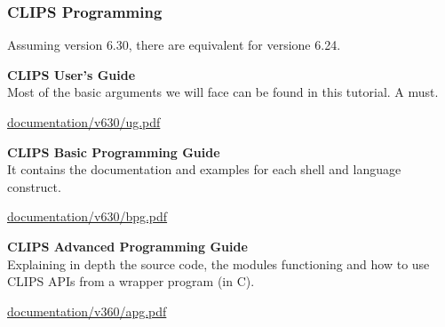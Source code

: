 \documentclass[xcolor={usenames,dvipsnames,svgnames}, compress]{beamer}
\begin{document}
\begin{frame}
  
  \frametitle{CLIPS Programming}
  
  Assuming version \textsf{6.30}, there are equivalent for versione \textsf{6.24}.\par\bigskip
  
  
  \textbf{CLIPS User's Guide}\\
  Most of the basic arguments we will face can be found in this
  tutorial. A must.
  \begin{flushright}
    \vspace{-5pt}
    \href{http://clipsrules.sourceforge.net/documentation/v630/ug.pdf}{documentation/v630/ug.pdf}
  \end{flushright}
  
  
  
  \textbf{CLIPS Basic Programming Guide}\\
  It contains the documentation and examples for each shell and
  language construct.
  \begin{flushright}
    \vspace{-5pt}
    \href{http://clipsrules.sourceforge.net/documentation/v630/bpg.pdf}{documentation/v630/bpg.pdf}
  \end{flushright}
  
  
  \textbf{CLIPS Advanced Programming Guide}\\
  Explaining in depth the source code, the modules functioning and how to use CLIPS APIs from a wrapper program (in C).
   \begin{flushright}
    \vspace{-5pt}
    \href{http://clipsrules.sourceforge.net/documentation/v630/apg.pdf}{documentation/v360/apg.pdf}
  \end{flushright}
  
\end{frame}
\end{document}
